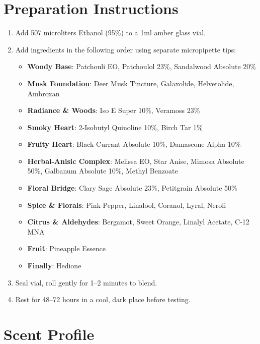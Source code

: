 \documentclass{article}
\begin{document}
\section{Preparation Instructions}

\begin{enumerate}
    \item Add 507 microliters Ethanol (95\%) to a 1ml amber glass vial.
    
    \item Add ingredients in the following order using separate micropipette tips:
    \begin{itemize}
        \item \textbf{Woody Base}: Patchouli EO, Patchoulol 23\%, Sandalwood Absolute 20\%
        \item \textbf{Musk Foundation}: Deer Musk Tincture, Galaxolide, Helvetolide, Ambroxan
        \item \textbf{Radiance \& Woods}: Iso E Super 10\%, Veramoss 23\%
        \item \textbf{Smoky Heart}: 2-Isobutyl Quinoline 10\%, Birch Tar 1\%
        \item \textbf{Fruity Heart}: Black Currant Absolute 10\%, Damascone Alpha 10\%
        \item \textbf{Herbal-Anisic Complex}: Melissa EO, Star Anise, Mimosa Absolute 50\%, Galbanum Absolute 10\%, Methyl Benzoate
        \item \textbf{Floral Bridge}: Clary Sage Absolute 23\%, Petitgrain Absolute 50\%
        \item \textbf{Spice \& Florals}: Pink Pepper, Linalool, Coranol, Lyral, Neroli
        \item \textbf{Citrus \& Aldehydes}: Bergamot, Sweet Orange, Linalyl Acetate, C-12 MNA
        \item \textbf{Fruit}: Pineapple Essence
        \item \textbf{Finally}: Hedione
    \end{itemize}
    
    \item Seal vial, roll gently for 1--2 minutes to blend.
    
    \item Rest for 48--72 hours in a cool, dark place before testing.
\end{enumerate}

\section{Scent Profile}
\end{document}
